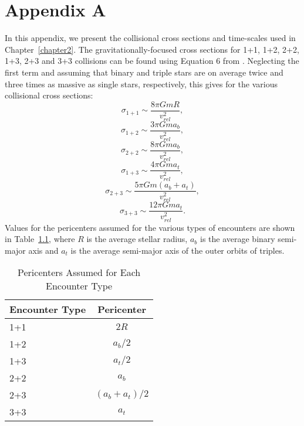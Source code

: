 \pagestyle{fancy}
\headheight 20pt
\chead{}
\lfoot{}
\cfoot{\thepage}
\rfoot{}
\renewcommand{\headrulewidth}{0.1pt}
\renewcommand{\footrulewidth}{0.1pt}

\chapter{Appendix A} \label{Appendix-A} 
\thispagestyle{fancy} 

In this appendix, we present the collisional cross sections and
time-scales used in Chapter~\ref{chapter2}.  The
gravitationally-focused cross sections for 1+1,
1+2, 2+2, 1+3, 2+3 and 3+3 collisions can be found using
Equation 6 from \citet{leonard89}.  Neglecting the first term and
assuming that binary and triple stars are on average twice and three
times as massive as single stars, respectively, this gives for the
various collisional cross sections:
\begin{equation}
\label{eqn:cs-1+1}
\sigma_{1+1} \sim \frac{8{\pi}GmR}{v_{rel}^2},
\end{equation}
\begin{equation}
\label{eqn:cs-1+2}
\sigma_{1+2} \sim \frac{3{\pi}Gma_b}{v_{rel}^2},
\end{equation}
\begin{equation}
\label{eqn:cs-2+2}
\sigma_{2+2} \sim \frac{8{\pi}Gma_b}{v_{rel}^2},
\end{equation}
\begin{equation}
\label{eqn:cs-1+3}
\sigma_{1+3} \sim \frac{4{\pi}Gma_t}{v_{rel}^2},
\end{equation}
\begin{equation}
\label{eqn:cs-2+3}
\sigma_{2+3} \sim \frac{5{\pi}Gm(a_b + a_t)}{v_{rel}^2},
\end{equation}
\begin{equation}
\label{eqn:cs-3+3}
\sigma_{3+3} \sim \frac{12{\pi}Gma_t}{v_{rel}^2}.
\end{equation}
Values for the
pericenters assumed for the various types of encounters are shown in
Table~\ref{table:peri}, where $R$ is the average stellar
radius, $a_b$ is the average binary semi-major axis and $a_t$ is the
average semi-major axis of the outer orbits of triples.

\begin{table}
\centering
\caption{Pericenters Assumed for Each Encounter Type
  \label{table:peri}}
\begin{tabular}{lc}
\hline
Encounter Type & Pericenter \\
\hline
1+1 & $2R$ \\
1+2 & $a_b/2$ \\
1+3 & $a_t/2$ \\
2+2 & $a_b$ \\
2+3 & $(a_b + a_t)/2$ \\
3+3 & $a_t$ \\
\hline
\end{tabular}
\end{table}

